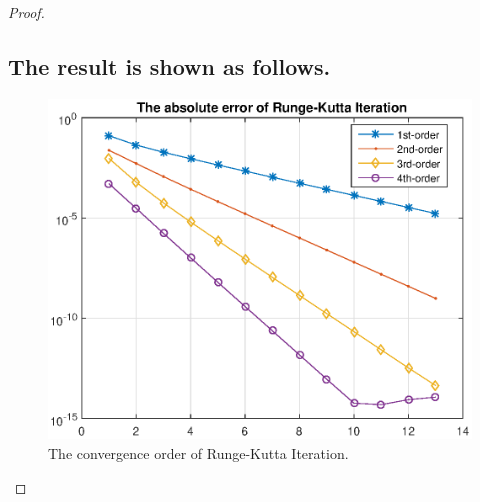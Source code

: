 \documentclass{article}
\begin{document}
\begin{proof}
\subsection{The result is shown as follows.}
\begin{figure}[htbp]
\centering
\includegraphics[width = 15cm]{errorlist.eps}
\caption{The convergence order of Runge-Kutta Iteration.}
\label{Convergence}
\end{figure}
\end{proof}
\end{document}
